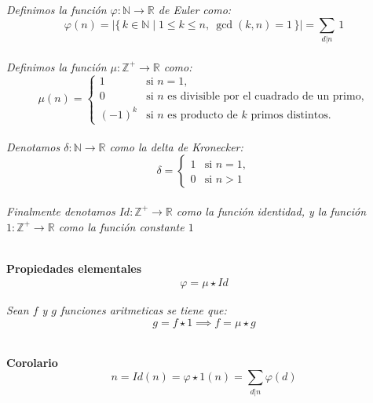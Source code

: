 \documentclass[11pt,letterpaper]{article}
\newcommand{\R}{\mathbb{R}}
\newcommand{\N}{\mathbb{N}}
\newcommand{\Z}{\mathbb{Z}}
\begin{document}
\begin{tcolorbox}[  
    colback=CINVESTAV!10,   %
    colframe=CINVESTAV,     %
    title=\textcolor{white}{Algunas funciones importantes}
]
\textit{Definimos la funci\'on $\varphi:\N\to \R$ de Euler como:\,\\
\[
\varphi(n) = \left| \{\, k \in \mathbb{N} \mid 1 \leq k \leq n,\ \gcd(k,n) = 1 \,\} \right|=\sum_{d|n}\,1
\]\,\\
Definimos la funci\'on $\mu:\Z^+\rightarrow \R$ como:\,\\
\[
\mu(n) =
\begin{cases}
  1 & \text{si } n = 1, \\[6pt]
  0 & \text{si } n \text{ es divisible por el cuadrado de un primo}, \\[6pt]
  (-1)^k & \text{si } n \text{ es producto de } k \text{ primos distintos}.
\end{cases}
\]\,\\
Denotamos $\delta:\N\to\R$ como la delta de Kronecker:\,\\
\[
\delta=
\begin{cases}
    1 & \text{si } n=1, \\[6pt]
    0 & \text{si } n>1
\end{cases}
\]\,\\
Finalmente denotamos $Id:\Z^{+}\to \R$ como la funci\'on identidad, y la funci\'on $1:\Z^+\to \R$ como la funci\'on
constante $1$}
\par\noindent\dotfill \,\\
\textbf{Propiedades elementales}
\begin{align*}
    \varphi=\mu \star Id
\end{align*}
\end{tcolorbox}
\begin{tcolorbox}[  
    colback=CINVESTAV!10,   %
    colframe=CINVESTAV,     %
    title=\textcolor{white}{Teorema de involuci\'on de Moebius}
]
\textit{Sean $f$ y $g$ funciones aritmeticas se tiene que:\,\\
\begin{equation*}
    g=f\star 1\implies f=\mu\star g
\end{equation*}}
\par\noindent\dotfill \,\\
\textbf{Corolario}
\begin{equation*}
    n=Id(n)=\varphi \star 1(n)=\sum_{d|n}\varphi(d)
\end{equation*}
\end{tcolorbox}
\end{document}
